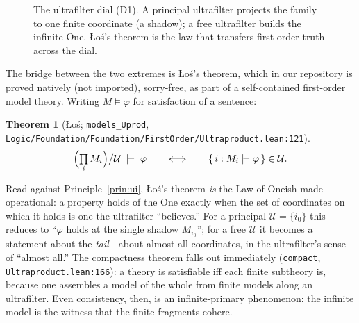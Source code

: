 \documentclass[]{article}
\newtheorem{theorem}{Theorem}
\theoremstyle{definition}
\theoremstyle{remark}
\newcommand{\code}[1]{\texttt{#1}}
\newcommand{\lpath}[1]{{\ttfamily\nolinkurl{#1}}}
\newcommand{\Uf}{\mathcal{U}}
\DeclareMathOperator{\uprod}{\textstyle\prod}
\begin{document}
\begin{figure}[H]
\centering
{}
\caption{The ultrafilter dial (D1). A principal ultrafilter projects the family to
one finite coordinate (a shadow); a free ultrafilter builds the infinite One.
{\L}o\'s's theorem is the law that transfers first-order truth across the dial.}
\label{fig:dial}
\end{figure}

The bridge between the two extremes is {\L}o\'s's theorem, which in our repository
is proved natively (not imported), sorry-free, as part of a self-contained
first-order model theory. Writing $M\models\varphi$ for satisfaction of a sentence:

\begin{theorem}[{\L}o\'s; \code{models\_Uprod}, \lpath{Logic/Foundation/Foundation/FirstOrder/Ultraproduct.lean:121}]
\label{thm:los}
\[
  \Bigl(\uprod_i M_i\Bigr)\big/\Uf \;\models\; \varphi
  \qquad\Longleftrightarrow\qquad
  \{\, i : M_i \models \varphi \,\}\in\Uf .
\]
\end{theorem}

Read against Principle~\ref{prin:ui}, {\L}o\'s's theorem \emph{is} the Law of
Oneish made operational: a property holds of the One exactly when the set of
coordinates on which it holds is one the ultrafilter ``believes.'' For a principal
$\Uf=\{i_0\}$ this reduces to ``$\varphi$ holds at the single shadow $M_{i_0}$'';
for a free $\Uf$ it becomes a statement about the \emph{tail}---about almost all
coordinates, in the ultrafilter's sense of ``almost all.'' The compactness theorem
falls out immediately (\code{compact},
\lpath{Ultraproduct.lean:166}): a theory is satisfiable iff each finite subtheory
is, because one assembles a model of the whole from finite models along an
ultrafilter. Even consistency, then, is an infinite-primary phenomenon: the
infinite model is the witness that the finite fragments cohere.
\end{document}
